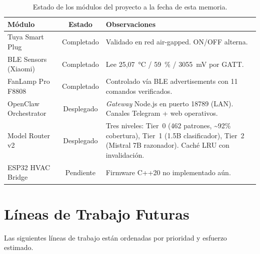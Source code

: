 \begin{table}[ht]
\centering
\begin{tabular}{|l|c|p{6cm}|}
\hline
\textbf{Módulo} & \textbf{Estado} & \textbf{Observaciones} \\
\hline
Tuya Smart Plug & Completado & Validado en red air-gapped. ON/OFF alterna. \\
BLE Sensors (Xiaomi) & Completado & Lee 25,07~°C / 59~\% / 3055~mV por GATT. \\
FanLamp Pro F8808 & Completado & Controlado vía BLE advertisements con 11 comandos verificados. \\
OpenClaw Orchestrator & Desplegado & \textit{Gateway} Node.js en puerto 18789 (LAN). Canales Telegram + web operativos. \\
Model Router v2 & Desplegado & Tres niveles: Tier~0 (462 patrones, \textasciitilde{}92\% cobertura), Tier~1 (1.5B clasificador), Tier~2 (Mistral 7B razonador). Caché LRU con invalidación. \\
ESP32 HVAC Bridge & Pendiente & Firmware C++20 no implementado aún. \\
\hline
\end{tabular}
\caption{Estado de los módulos del proyecto a la fecha de esta memoria.}
\end{table}

\section{Líneas de Trabajo Futuras}

Las siguientes líneas de trabajo están ordenadas por prioridad y esfuerzo estimado.

